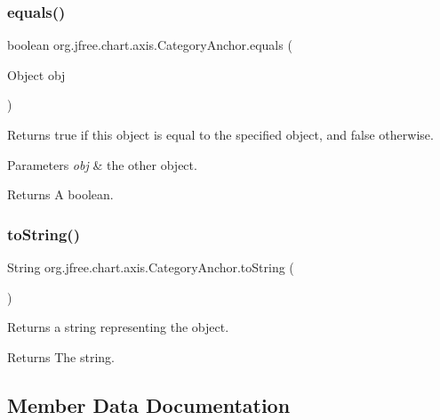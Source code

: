 \subsubsection{\texorpdfstring{equals()}{equals()}}
{\footnotesize\ttfamily boolean org.\+jfree.\+chart.\+axis.\+Category\+Anchor.\+equals (\begin{DoxyParamCaption}\item[{Object}]{obj }\end{DoxyParamCaption})}

Returns {\ttfamily true} if this object is equal to the specified object, and {\ttfamily false} otherwise.


\begin{DoxyParams}{Parameters}
{\em obj} & the other object.\\
\hline
\end{DoxyParams}
\begin{DoxyReturn}{Returns}
A boolean. 
\end{DoxyReturn}
\mbox{\label{classorg_1_1jfree_1_1chart_1_1axis_1_1_category_anchor_a4cf779147a635b113bc0360021a44406}} 
\subsubsection{\texorpdfstring{to\+String()}{toString()}}
{\footnotesize\ttfamily String org.\+jfree.\+chart.\+axis.\+Category\+Anchor.\+to\+String (\begin{DoxyParamCaption}{ }\end{DoxyParamCaption})}

Returns a string representing the object.

\begin{DoxyReturn}{Returns}
The string. 
\end{DoxyReturn}


\subsection{Member Data Documentation}
\mbox{\label{classorg_1_1jfree_1_1chart_1_1axis_1_1_category_anchor_a38b7ab23b41abe03e4be8b24035ada9c}} 
